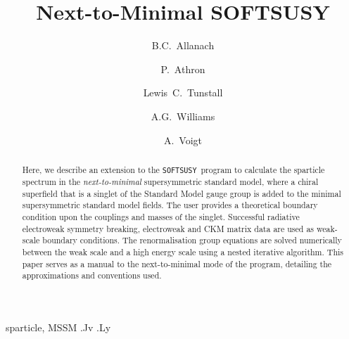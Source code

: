 \documentclass[final,3p,times,pdflatex]{elsarticle}
\begin{document}
\begin{frontmatter}

\title{Next-to-Minimal SOFTSUSY}

\author{B.C.~Allanach}
\address{DAMTP, CMS, University of Cambridge, Wilberforce road, Cambridge, CB3
  0WA, United Kingdom}

\author{P.~Athron}
\author{Lewis~C.~Tunstall}
\author{A.G.~Williams}
\address{ARC Centre of Excellence for Particle Physics at 
the Tera-scale, School of Chemistry and Physics, University of Adelaide, 
Adelaide SA 5005 Australia}

\author{A.~Voigt}
\address{Institut f\"ur Kern- und Teilchenphysik,
TU Dresden, Zellescher Weg 19, 01069 Dresden, Germany}
\begin{abstract}
  Here, we describe an extension to the
  {\tt SOFTSUSY}~program to calculate the sparticle spectrum in the
  {\em next-to-minimal} supersymmetric standard model, where a chiral
  superfield that is a singlet of the Standard Model gauge group is added to
  the minimal supersymmetric standard model fields. 
  The user provides a theoretical boundary condition upon the couplings and
  masses of the singlet.
  Successful radiative electroweak symmetry breaking,
  electroweak and CKM matrix data are used
  as weak-scale boundary conditions. 
  The renormalisation group equations are solved
  numerically between the weak scale and a high energy scale using a nested
  iterative algorithm. 
  This paper serves as a manual to the
  next-to-minimal mode of the program, detailing the approximations and
  conventions used. 
\end{abstract}

\begin{keyword}
sparticle, 
MSSM
.Jv
.Ly
\end{keyword}
\end{frontmatter}
\end{document}
